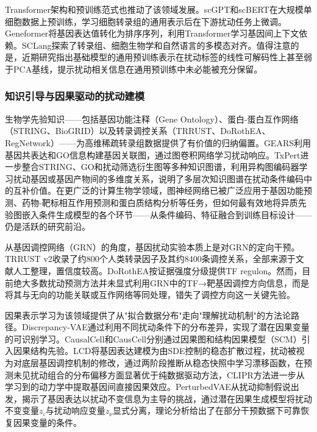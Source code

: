 Transformer架构和预训练范式也推动了该领域发展。scGPT\cite{cui2024scgpt}和scBERT\cite{yang2022scbert}在大规模单细胞数据上预训练，学习细胞转录组的通用表示后在下游扰动任务上微调。Geneformer\cite{theodoris2023transferable}将基因表达值转化为排序序列，利用Transformer学习基因间上下文依赖。SCLang\cite{zeng2025sclang}探索了转录组、细胞生物学和自然语言的多模态对齐。值得注意的是，近期研究指出基础模型的通用预训练表示在扰动标签的线性可解码性上甚至弱于PCA基线\cite{jiang2025what}，提示扰动相关信息在通用预训练中未必能被充分保留。

\subsubsection{知识引导与因果驱动的扰动建模}

生物学先验知识——包括基因功能注释（Gene Ontology）、蛋白-蛋白互作网络（STRING、BioGRID）以及转录调控关系（TRRUST\cite{han2018trrust}、DoRothEA\cite{garcia2019dorothea}、RegNetwork）——为高维稀疏转录组数据提供了有价值的归纳偏置。GEARS\cite{roohani2024gears}利用基因共表达和GO信息构建基因关联图，通过图卷积网络学习扰动响应。TxPert\cite{wu2026txpert}进一步整合STRING、GO和扰动筛选衍生图等多种知识图谱，利用异构图编码器学习扰动基因或基因产物间的多维度关系，说明了多层次知识图谱在扰动条件编码中的互补价值。在更广泛的计算生物学领域，图神经网络已被广泛应用于基因功能预测\cite{zhang2022graph}、药物-靶标相互作用预测和蛋白质结构分析等任务，但如何最有效地将异质先验图嵌入条件生成模型的各个环节——从条件编码、特征融合到训练目标设计——仍是活跃的研究前沿。

从基因调控网络（GRN）的角度，基因扰动实验本质上是对GRN的定向干预。TRRUST v2\cite{han2018trrust}收录了约800个人类转录因子及其约8400条调控关系，全部来源于文献人工整理，置信度较高。DoRothEA\cite{garcia2019dorothea}按证据强度分级提供TF regulon。然而，目前绝大多数扰动预测方法并未显式利用GRN中的TF→靶基因调控方向信息，而是将其与无向的功能关联或互作网络等同处理，错失了调控方向这一关键先验。

因果表示学习为该领域提供了从"拟合数据分布"走向"理解扰动机制"的方法论路径\cite{scholkopf2021toward}。Discrepancy-VAE\cite{zhang2023identifiability}通过利用不同扰动条件下的分布差异，实现了潜在因果变量的可识别学习。CausalCell\cite{deng2024causal}和CausCell\cite{gao2025causal}分别通过因果图和结构因果模型（SCM）引入因果结构先验。LCD\cite{lorch2025latent}将基因表达建模为由SDE控制的稳态扩散过程，扰动被视为对底层基因调控机制的修改，通过两阶段推断从稳态快照中学习漂移函数，在预测未见扰动组合的分布偏移方面显著优于纯数据驱动方法，CLIPR方法进一步从学习到的动力学中提取基因间直接因果效应。PerturbedVAE\cite{jiang2025what}从扰动抑制假说出发，揭示了基因表达以扰动不变信息为主导的挑战，通过潜在因果生成模型将扰动不变变量$z_\iota$与扰动响应变量$z_\nu$显式分离，理论分析给出了在部分干预数据下可靠恢复因果变量的条件。

